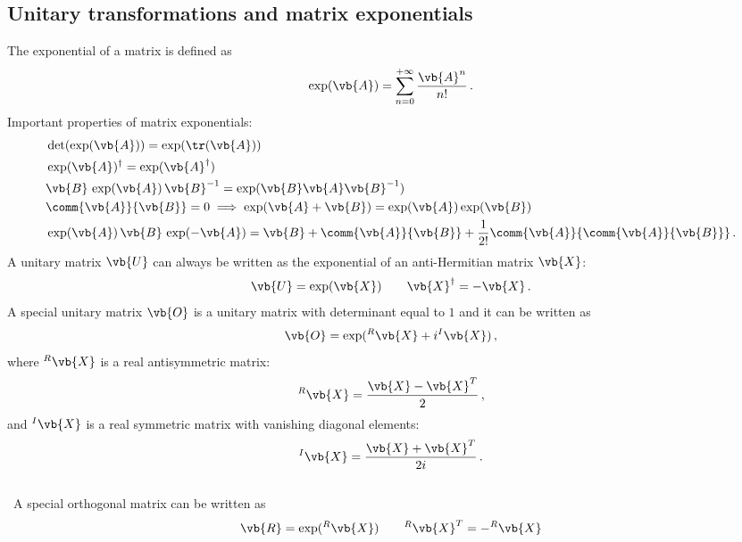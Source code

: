 \subsection{Unitary transformations and matrix exponentials}
    The exponential of a matrix is defined as
    \begin{equation}
        \exp(\vb{A}) = \sum_{n=0}^{+\infty} \frac{\vb{A}^n}{n!} \thinspace .
    \end{equation}
    Important properties of matrix exponentials:
    \begin{align}
        & \det(\exp(\vb{A})) = \exp(\tr(\vb{A})) \\
        & \exp(\vb{A})^\dagger = \exp(\vb{A}^\dagger) \\
        & \vb{B} \thinspace \exp(\vb{A}) \thinspace \vb{B}^{-1} = \exp(\vb{B} \vb{A} \vb{B}^{-1}) \\
        & \comm{\vb{A}}{\vb{B}} = 0 \implies \exp(\vb{A} + \vb{B}) = \exp(\vb{A}) \exp(\vb{B}) \\
        & \exp(\vb{A}) \thinspace \vb{B} \thinspace \exp(-\vb{A}) = \vb{B} + \comm{\vb{A}}{\vb{B}} + \frac{1}{2!} \comm{\vb{A}}{\comm{\vb{A}}{\vb{B}}} \thinspace .
    \end{align}
    A unitary matrix $\vb{U}$ can always be written as the exponential of an anti-Hermitian matrix $\vb{X}$:
    \begin{equation}
        \vb{U} = \exp(\vb{X}) \qquad \vb{X}^\dagger = - \vb{X} \thinspace .
    \end{equation}
    A special unitary matrix $\vb{O}$ is a unitary matrix with determinant equal to $1$ and it can be written as
    \begin{equation}
        \vb{O} = \exp({}^R \vb{X} + i {}^I \vb{X}) \thinspace ,
    \end{equation}
    where ${}^R \vb{X}$ is a real antisymmetric matrix:
    \begin{equation}
        {}^R \vb{X} = \frac{\vb{X} - \vb{X}^T}{2} \thinspace ,
    \end{equation}
    and ${}^I \vb{X}$ is a real symmetric matrix with vanishing diagonal elements:
    \begin{equation}
        {}^I \vb{X} = \frac{\vb{X} + \vb{X}^T}{2i} \thinspace .
    \end{equation}
    \\\
    A special orthogonal matrix can be written as
    \begin{equation}
        \vb{R} = \exp({}^R \vb{X}) \qquad {}^R \vb{X}^T = - {}^R \vb{X}
    \end{equation}
